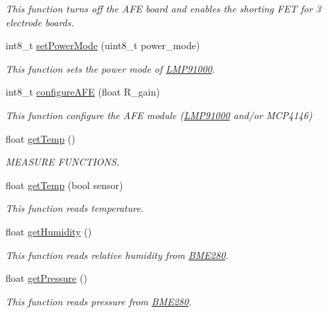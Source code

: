 \begin{DoxyCompactItemize}
\begin{DoxyCompactList}\small\item\em This function turns off the A\+FE board and enables the shorting F\+ET for 3 electrode boards. \end{DoxyCompactList}\item 
int8\+\_\+t \hyperlink{class_gas_aa9727ba2e2d29e1979da2b419564e679}{set\+Power\+Mode} (uint8\+\_\+t power\+\_\+mode)
\begin{DoxyCompactList}\small\item\em This function sets the power mode of \hyperlink{class_l_m_p91000}{L\+M\+P91000}. \end{DoxyCompactList}\item 
int8\+\_\+t \hyperlink{class_gas_af76023d6aa1986ca220a7fe2362e2c4c}{configure\+A\+FE} (float R\+\_\+gain)
\begin{DoxyCompactList}\small\item\em This function configure the A\+FE module (\hyperlink{class_l_m_p91000}{L\+M\+P91000} and/or M\+C\+P4146) \end{DoxyCompactList}\item 
float \hyperlink{class_gas_a1650ec9742154290a7a3f63379050d26}{get\+Temp} ()
\begin{DoxyCompactList}\small\item\em M\+E\+A\+S\+U\+RE F\+U\+N\+C\+T\+I\+O\+NS. \end{DoxyCompactList}\item 
float \hyperlink{class_gas_acdb7c24963bd545e02e582103260f866}{get\+Temp} (bool sensor)
\begin{DoxyCompactList}\small\item\em This function reads temperature. \end{DoxyCompactList}\item 
float \hyperlink{class_gas_a455f761086e030428ca77d6a6f535ad0}{get\+Humidity} ()
\begin{DoxyCompactList}\small\item\em This function reads relative humidity from \hyperlink{class_b_m_e280}{B\+M\+E280}. \end{DoxyCompactList}\item 
float \hyperlink{class_gas_afa9e24ecbe2f2201b6b64061d9a80a5a}{get\+Pressure} ()
\begin{DoxyCompactList}\small\item\em This function reads pressure from \hyperlink{class_b_m_e280}{B\+M\+E280}. \end{DoxyCompactList}\item 

\end{DoxyCompactItemize}

